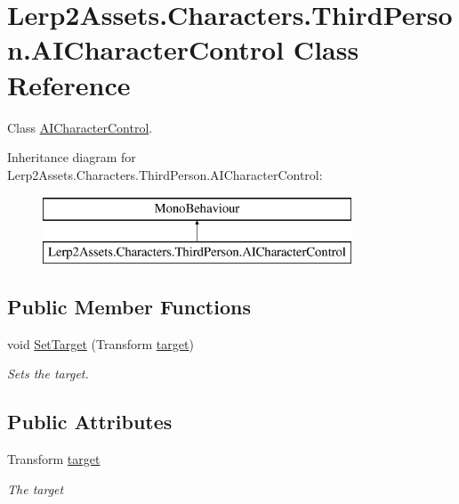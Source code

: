 \hypertarget{class_lerp2_assets_1_1_characters_1_1_third_person_1_1_a_i_character_control}{}\section{Lerp2\+Assets.\+Characters.\+Third\+Person.\+A\+I\+Character\+Control Class Reference}
\label{class_lerp2_assets_1_1_characters_1_1_third_person_1_1_a_i_character_control}


Class \hyperlink{class_lerp2_assets_1_1_characters_1_1_third_person_1_1_a_i_character_control}{A\+I\+Character\+Control}.  


Inheritance diagram for Lerp2\+Assets.\+Characters.\+Third\+Person.\+A\+I\+Character\+Control\+:\begin{figure}[H]
\begin{center}
\leavevmode
\includegraphics[height=2.000000cm]{class_lerp2_assets_1_1_characters_1_1_third_person_1_1_a_i_character_control}
\end{center}
\end{figure}
\subsection*{Public Member Functions}
\begin{DoxyCompactItemize}
\item 
void \hyperlink{class_lerp2_assets_1_1_characters_1_1_third_person_1_1_a_i_character_control_ac80a324a10dd4b37e1afda95e97c0093}{Set\+Target} (Transform \hyperlink{class_lerp2_assets_1_1_characters_1_1_third_person_1_1_a_i_character_control_ae0313dba18042eed3f91c9d5c44b772a}{target})
\begin{DoxyCompactList}\small\item\em Sets the target. \end{DoxyCompactList}\end{DoxyCompactItemize}
\subsection*{Public Attributes}
\begin{DoxyCompactItemize}
\item 
Transform \hyperlink{class_lerp2_assets_1_1_characters_1_1_third_person_1_1_a_i_character_control_ae0313dba18042eed3f91c9d5c44b772a}{target}
\begin{DoxyCompactList}\small\item\em The target \end{DoxyCompactList}\end{DoxyCompactItemize}
